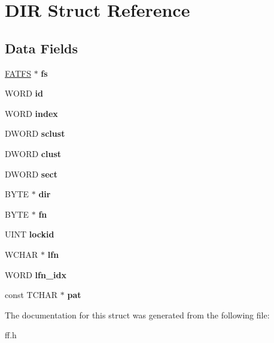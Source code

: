 \hypertarget{struct_d_i_r}{}\section{D\+IR Struct Reference}
\label{struct_d_i_r}
\subsection*{Data Fields}
\begin{DoxyCompactItemize}
\item 
\mbox{\label{struct_d_i_r_a312eaa66cb703fb2993ea98173dc0c9a}} 
\hyperlink{struct_f_a_t_f_s}{F\+A\+T\+FS} $\ast$ {\bfseries fs}
\item 
\mbox{\label{struct_d_i_r_aca2c95a99a04173917ec70c030891383}} 
W\+O\+RD {\bfseries id}
\item 
\mbox{\label{struct_d_i_r_ab95119fbacbe45e3e9ee0f962b844092}} 
W\+O\+RD {\bfseries index}
\item 
\mbox{\label{struct_d_i_r_a9212af5877b94d790dd3bab3aa320994}} 
D\+W\+O\+RD {\bfseries sclust}
\item 
\mbox{\label{struct_d_i_r_acfbb8ba2d6e73b6f999ceffd1857c190}} 
D\+W\+O\+RD {\bfseries clust}
\item 
\mbox{\label{struct_d_i_r_ad01fcc812ed0dad11a593574336adc9e}} 
D\+W\+O\+RD {\bfseries sect}
\item 
\mbox{\label{struct_d_i_r_a6c2a8c0cf2d55ae99775e93a16593449}} 
B\+Y\+TE $\ast$ {\bfseries dir}
\item 
\mbox{\label{struct_d_i_r_a32da2f31d6c3b6c42eef981cb0cfd2ee}} 
B\+Y\+TE $\ast$ {\bfseries fn}
\item 
\mbox{\label{struct_d_i_r_a4506e8e241aea683cc1cd4d7c8db1008}} 
U\+I\+NT {\bfseries lockid}
\item 
\mbox{\label{struct_d_i_r_af62fd789383e6f1397f74617e11c135d}} 
W\+C\+H\+AR $\ast$ {\bfseries lfn}
\item 
\mbox{\label{struct_d_i_r_acad41b18758c9278c14d47076e8149fc}} 
W\+O\+RD {\bfseries lfn\+\_\+idx}
\item 
\mbox{\label{struct_d_i_r_a1f636884096de91deb97f59209d60e96}} 
const T\+C\+H\+AR $\ast$ {\bfseries pat}
\end{DoxyCompactItemize}


The documentation for this struct was generated from the following file\+:\begin{DoxyCompactItemize}
\item 
ff.\+h\end{DoxyCompactItemize}
